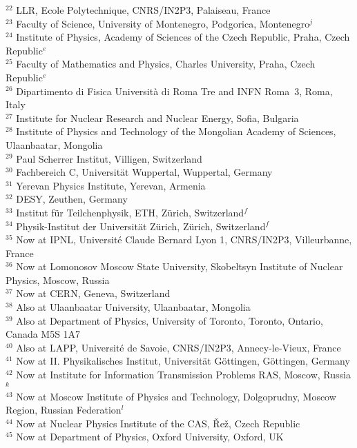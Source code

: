 \documentclass[12pt]{article}
\begin{document}
\begin{flushleft}
{ $ ^{22}$ LLR, Ecole Polytechnique, CNRS/IN2P3, Palaiseau, France \\
 $ ^{23}$ Faculty of Science, University of Montenegro,
          Podgorica, Montenegro$^{ j}$ \\
 $ ^{24}$ Institute of Physics, Academy of Sciences of the Czech Republic,
          Praha, Czech Republic$^{ e}$ \\
 $ ^{25}$ Faculty of Mathematics and Physics, Charles University,
          Praha, Czech Republic$^{ e}$ \\
 $ ^{26}$ Dipartimento di Fisica Universit\`a di Roma Tre
          and INFN Roma~3, Roma, Italy \\
 $ ^{27}$ Institute for Nuclear Research and Nuclear Energy,
          Sofia, Bulgaria \\
 $ ^{28}$ Institute of Physics and Technology of the Mongolian
          Academy of Sciences, Ulaanbaatar, Mongolia \\
 $ ^{29}$ Paul Scherrer Institut,
          Villigen, Switzerland \\
 $ ^{30}$ Fachbereich C, Universit\"at Wuppertal,
          Wuppertal, Germany \\
 $ ^{31}$ Yerevan Physics Institute, Yerevan, Armenia \\
 $ ^{32}$ DESY, Zeuthen, Germany \\
 $ ^{33}$ Institut f\"ur Teilchenphysik, ETH, Z\"urich, Switzerland$^{ f}$ \\
 $ ^{34}$ Physik-Institut der Universit\"at Z\"urich, Z\"urich, Switzerland$^{ f}$ \\

\bigskip
 $ ^{35}$ Now at IPNL, Universit\'e Claude Bernard Lyon 1, CNRS/IN2P3,
          Villeurbanne, France \\
 $ ^{36}$ Now at Lomonosov Moscow State University,
          Skobeltsyn Institute of Nuclear Physics, Moscow, Russia \\
 $ ^{37}$ Now at CERN, Geneva, Switzerland \\
 $ ^{38}$ Also at Ulaanbaatar University, Ulaanbaatar, Mongolia \\
 $ ^{39}$ Also at  Department of Physics, University of Toronto,
          Toronto, Ontario, Canada M5S 1A7 \\
 $ ^{40}$ Also at LAPP, Universit\'e de Savoie, CNRS/IN2P3,
          Annecy-le-Vieux, France \\
 $ ^{41}$ Now at II. Physikalisches Institut, Universit\"at G\"ottingen,
          G\"ottingen, Germany \\
 $ ^{42}$ Now at Institute for Information Transmission Problems RAS,
          Moscow, Russia$^{ k}$ \\
 $ ^{43}$ Now at Moscow Institute of Physics and Technology,
          Dolgoprudny, Moscow Region, Russian Federation$^{ l}$ \\
 $ ^{44}$ Now at Nuclear Physics Institute of the CAS,
          \v{R}e\v{z}, Czech Republic \\
 $ ^{45}$ Now at Department of Physics, Oxford University,
          Oxford, UK \\


}
\end{flushleft}
\end{document}
